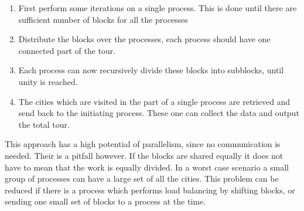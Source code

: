 \begin{enumerate}
\item First perform some iterations on a single process. This is done until there are sufficient number of blocks for all the processes
\item Distribute the blocks over the processes, each process should have one connected part of the tour.
\item Each process can now recursively divide these blocks into subblocks, until unity is reached.
\item The cities which are visited in the part of a single process are retrieved and send back to the initiating process. These one can collect the data and output the total tour.
\end{enumerate}

This approach has a high potential of parallelism, since no communication is needed. Their is a pitfall however. If the blocks are shared equally it does not have to mean that the work is equally divided. In a worst case scenario a small group of processes can have a large set of all the cities. This problem can be reduced if there is a process which performs load balancing by shifting blocks, or sending one small set of blocks to a process at the time.
